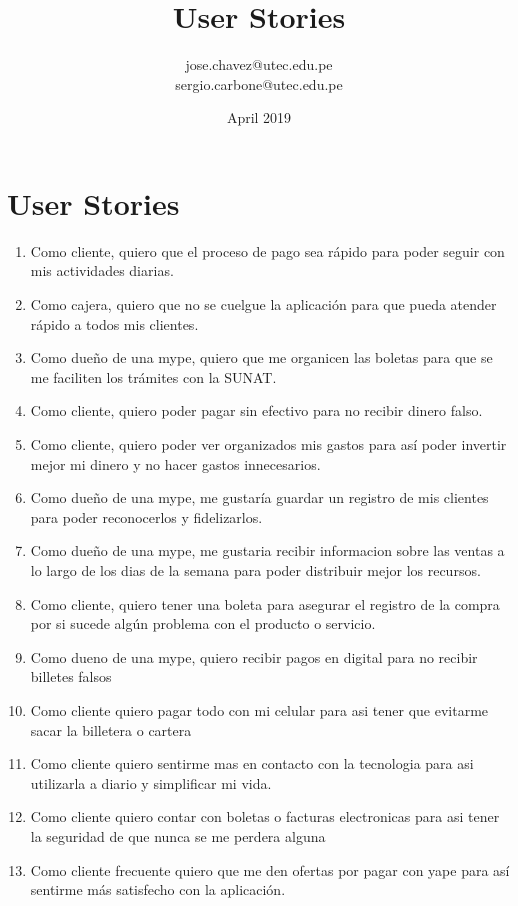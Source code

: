 \documentclass{article}
\title{User Stories}
\author{jose.chavez@utec.edu.pe\\sergio.carbone@utec.edu.pe }
\date{April 2019}
\begin{document}
\maketitle

\section{User Stories}
\begin{enumerate}

    \item Como cliente, quiero que el proceso de pago sea rápido para poder seguir con mis actividades diarias.
    \item Como cajera, quiero que no se cuelgue la aplicación para que pueda atender rápido a todos mis clientes.
    \item Como dueño de una mype, quiero que me organicen las boletas para que se me faciliten los trámites con la SUNAT.
    \item Como cliente, quiero poder pagar sin efectivo para no recibir dinero falso.  
    \item Como cliente, quiero poder ver organizados mis gastos para así poder invertir mejor mi dinero y no hacer gastos innecesarios.
    \item Como dueño de una mype, me gustaría guardar un registro de mis clientes para poder reconocerlos y fidelizarlos.
    \item Como dueño de una mype, me gustaria recibir informacion sobre las ventas a lo largo de los dias de la semana para poder distribuir mejor los recursos.
    \item Como cliente, quiero tener una boleta para asegurar el registro de la compra por si sucede algún problema con el producto o servicio.
    \item Como dueno de una mype, quiero recibir pagos en digital para no recibir billetes falsos
    \item Como cliente quiero pagar todo con mi celular para asi tener que evitarme sacar la billetera o cartera
    \item Como cliente quiero sentirme mas en contacto con la tecnologia para asi utilizarla a diario y simplificar mi vida.
    \item Como cliente quiero contar con boletas o facturas electronicas para asi tener la seguridad de que nunca se me perdera alguna
   \item Como cliente frecuente quiero que me den ofertas por pagar con yape para así sentirme más satisfecho con la aplicación.

\end{enumerate}
\end{document}
